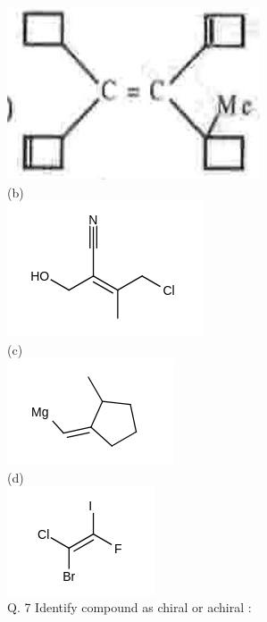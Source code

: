 \documentclass[10pt]{article}
\begin{document}
\includegraphics[max width=\textwidth, center]{2025_01_28_8470952b98110cec3aabg-152}\\
(b)\\
\includegraphics{smile-2b3ede8708e0ddc37d1a9fecd2a3061c0c270986}\\
(c)\\
\includegraphics{smile-f465bfc6ac5305edb7e8e21e00c8f6fa21168c7b}\\
(d)\\
\includegraphics{smile-97e92b6f772fcbd106eae44c8177a2083f67101f}\\
Q. 7 Identify compound as chiral or achiral :\\
\end{document}
